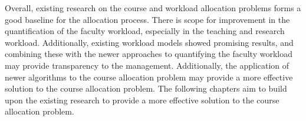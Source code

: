Overall, existing research on the course and workload allocation problems forms a good baseline for the allocation process. There is scope for improvement in the quantification of the faculty workload, especially in the teaching and research workload. Additionally, existing workload models showed promising results, and combining these with the newer approaches to quantifying the faculty workload may provide transparency to the management. Additionally, the application of newer algorithms to the course allocation problem may provide a more effective solution to the course allocation problem. The following chapters aim to build upon the existing research to provide a more effective solution to the course allocation problem.
